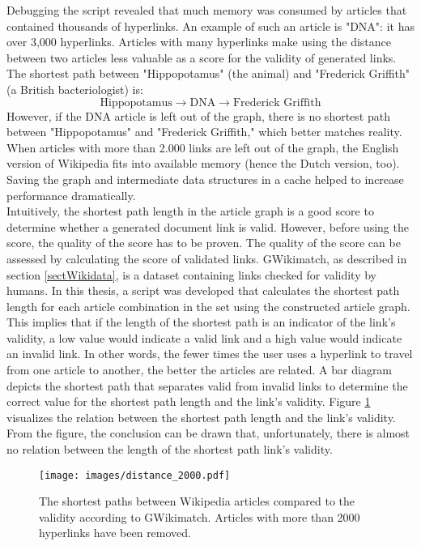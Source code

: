 Debugging the script revealed that much memory was consumed by articles that contained thousands of hyperlinks. An example of such an article is "DNA": it has over 3,000 hyperlinks. Articles with many hyperlinks make using the distance between two articles less valuable as a score for the validity of generated links. The shortest path between "Hippopotamus" (the animal) and "Frederick Griffith" (a British bacteriologist) is: $$ \text{Hippopotamus} \longrightarrow \text{DNA} \longrightarrow \text{Frederick\ Griffith}$$
However, if the DNA article is left out of the graph, there is no shortest path between "Hippopotamus" and "Frederick Griffith," which better matches reality. \\
When articles with more than 2.000 links are left out of the graph, the English version of Wikipedia fits into available memory (hence the Dutch version, too). Saving the graph and intermediate data structures in a cache helped to increase performance dramatically.\\
 
 Intuitively, the shortest path length in the article graph is a good score to determine whether a generated document link is valid. However, before using the score, the quality of the score has to be proven. The quality of the score can be assessed by calculating the score of validated links. GWikimatch, as described in section \ref{sectWikidata}, is a dataset containing links checked for validity by humans. In this thesis, a script was developed that calculates the shortest path length for each article combination in the set using the constructed article graph. \\

This implies that if the length of the shortest path is an indicator of the link's validity, a low value would indicate a valid link and a high value would indicate an invalid link. In other words, the fewer times the user uses a hyperlink to travel from one article to another, the better the articles are related. A bar diagram depicts the shortest path that separates valid from invalid links to determine the correct value for the shortest path length and the link's validity. Figure \ref{imgDistance2000} visualizes the relation between the shortest path length and the link's validity. From the figure, the conclusion can be drawn that, unfortunately, there is almost no relation between the length of the shortest path link's validity.\\

\begin{figure}[h]
\centering
\captionsetup{justification=centering}
\texttt{[image: images/distance\_2000.pdf]}
\caption{The shortest paths between Wikipedia articles compared to the validity according to GWikimatch. Articles with more than 2000 hyperlinks have been removed. }
\label{imgDistance2000}
\end{figure}

